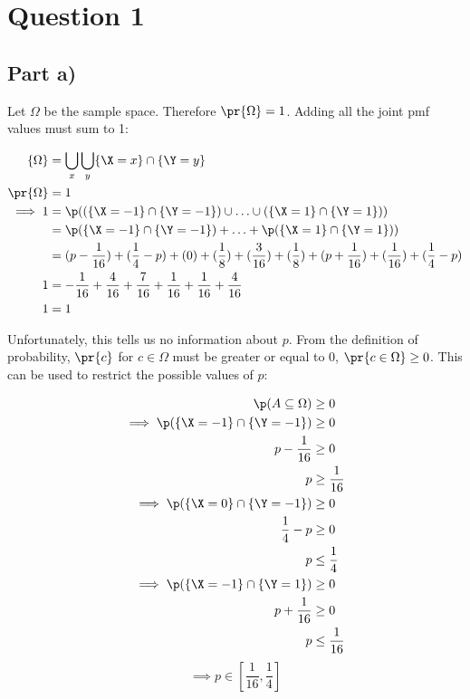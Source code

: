 \section{Question 1}

\subsection{Part a)}

Let $\Omega$ be the sample space. Therefore $\pr{\Omega} = 1$.
Adding all the joint pmf values must sum to 1:

\begin{align*}
\{ \Omega \} &= \bigcup \limits _{x} \bigcup \limits _y \{ \X = x \} \cap \{ \Y = y \} \\
\pr{\Omega} &= 1 \\
\implies 1 &= \p((\{ \X = -1 \} \cap \{ \Y = -1 \}) \cup \ldots \cup (\{ \X = 1 \} \cap \{ \Y = 1 \})) \\
&= \p(\{ \X = -1 \} \cap \{ \Y = -1 \}) + \ldots + \p(\{ \X = 1 \} \cap \{ \Y = 1 \})) \\
&= (p - \frac{1}{16}) + (\frac{1}{4} - p) + (0) +
(\frac{1}{8}) + (\frac{3}{16}) + (\frac{1}{8}) +
(p + \frac{1}{16}) + (\frac{1}{16}) + (\frac{1}{4} - p) \\
1 &= -\frac{1}{16} + \frac{4}{16} + \frac{7}{16} + \frac{1}{16} + \frac{1}{16} + \frac{4}{16} \\
1 &= 1
\end{align*}

Unfortunately, this tells us no information about $p$.
From the definition of probability, $\pr{c}$ for $c \in \Omega$ must be greater or equal to 0, $\pr{c \in \Omega} \geq 0$.
This can be used to restrict the possible values of $p$:

\begin{align*}
\p(A \subseteq \Omega) &\geq 0 \\
\implies \p(\{ \X = -1 \} \cap \{ \Y = -1 \}) &\geq 0 \\
p - \frac{1}{16} &\geq 0 \\
p &\geq \frac{1}{16} \\
\implies \p(\{ \X = 0 \} \cap \{ \Y = -1 \}) &\geq 0 \\
\frac{1}{4} - p &\geq 0 \\
p &\leq \frac{1}{4} \\
\implies \p(\{ \X = -1 \} \cap \{ \Y = 1 \}) &\geq 0 \\
p + \frac{1}{16} &\geq 0 \\
p &\leq \frac{1}{16}
\end{align*}
\begin{equation}
\label{th:q1a-p-domain}
\implies p \in [\frac{1}{16}, \frac{1}{4}]
\end{equation}

